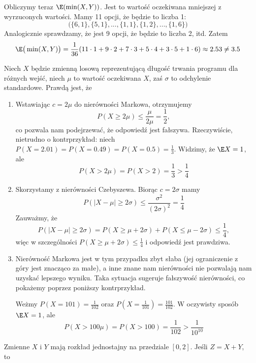 \begin{solutions}
    Obliczymy teraz $\E (\min(X, Y))$. Jest to wartość oczekiwana mniejszej z wyrzuconych wartości. Mamy 11 opcji, że będzie to liczba 1:
    $$\big(\{6, 1\}, \{5, 1\}, ..., \{1, 1\}, \{1, 2\}, ..., \{1, 6\}\big)$$
    Analogicznie sprawdzamy, że jest 9 opcji, że będzie to liczba 2, itd. Zatem
    $$
    \E \big(\min(X, Y)\big) = \frac{1}{36} (11 \cdot 1 + 9 \cdot 2 + 7 \cdot 3 + 5 \cdot 4 + 3 \cdot 5 + 1 \cdot 6) \approx 2.53 \neq 3.5
    $$
    
    \sol Niech $X$ będzie zmienną losową reprezentującą długość trwania programu dla różnych wejść, niech $\mu$ to wartość oczekiwana $X$, zaś $\sigma$ to odchylenie standardowe. Prawdą jest, że

    \begin{enumerate}[\bf A.]
        \item Wstawiając $c = 2\mu$ do nierówności Markowa, otrzymujemy
        $$P(X \geq 2 \mu) \leq \frac{\mu}{2\mu} = \frac{1}{2},$$
        co pozwala nam podejrzewać, że odpowiedź jest fałszywa. Rzeczywiście, nietrudno o kontrprzykład: niech $P(X = 2.01) = P(X = 0.49) = P(X = 0.5) = \frac{1}{3}$. Widzimy, że $\E X = 1$, ale
        $$P(X > 2\mu) = P(X > 2) = \frac{1}{3} > \frac{1}{4}$$

        \item Skorzystamy z nierówności Czebyszewa. Biorąc $c = 2\sigma$ mamy
        $$P(|X - \mu| \geq 2 \sigma) \leq \frac{\sigma^2}{(2 \sigma)^2} = \frac{1}{4}$$
        Zauważmy, że
        $$P(|X - \mu| \geq 2 \sigma) = P(X \geq \mu + 2 \sigma) + P(X \leq \mu - 2 \sigma) \leq \frac{1}{4},$$
        więc w szczególności $P(X \geq \mu + 2 \sigma) \leq \frac{1}{4}$ i odpowiedź jest prawdziwa.

        \item Nierówność Markowa jest w tym przypadku zbyt słaba (jej ograniczenie z góry jest znacząco za małe), a inne znane nam nierówności nie pozwalają nam uzyskać lepszego wyniku. Taka sytuacja sugeruje fałszywość nierówności, co pokażemy poprzez poniższy kontrprzykład.

        Weżmy $P(X = 101) = \frac{1}{102}$ oraz $P(X = \frac{1}{101}) = \frac{101}{102}$. W oczywisty sposób $\E X = 1$, ale
        $$P(X > 100\mu) = P(X > 100) = \frac{1}{102} > \frac{1}{10^{10}}$$
    \end{enumerate}

    \sol Zmienne $X$ i $Y$ mają rozkład jednostajny na przedziale $[0, 2]$. Jeśli $Z = X + Y$, to


\end{solutions}

